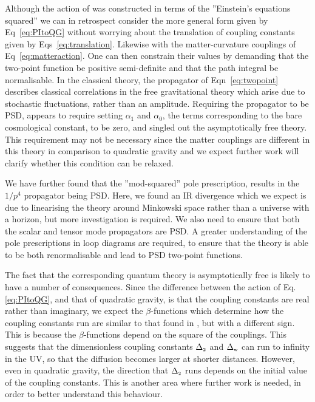 \documentclass[aps,preprintnumbers,superscriptaddress,longbibliography]{revtex4-1}
\def\R2Term{\Delta_{\text{\tiny 2}}}
\def\WeylTerm{\Delta_{\text{\tiny w}}}
\begin{document}
Although the action of \cite{oppenheim2023covariant} was constructed in terms of the ''Einstein's equations squared'' we can in retrospect consider the more general form given by Eq~\eqref{eq:PItoQG} without worrying about the translation of coupling constants given by Eqs~\eqref{eq:translation}. Likewise with the matter-curvature couplings of Eq~\eqref{eq:matteraction}. One can then constrain their values by demanding that the two-point function be positive semi-definite and that the path integral be normalisable.  In the classical theory, the propagator of  Eqn~\eqref{eq:twopoint} describes classical correlations in the free gravitational theory which arise due to stochastic fluctuations, rather than an amplitude. Requiring the propagator to be PSD, appears to require setting $\alpha_1$ and $\alpha_0$, the terms corresponding to the bare cosmological constant, to be zero, and singled out the asymptotically free theory. This requirement may not be necessary since the matter couplings are different in this theory in comparison to quadratic gravity %
and we expect further work will clarify whether this condition can be relaxed.

We have further found that the ''mod-squared'' pole prescription, results in the $1/p^4$ propagator being  PSD.  Here, we found an IR divergence which we expect is due to linearising the theory around Minkowski space rather than a universe with a horizon, but more investigation is required. We also  need to 
ensure that both the scalar and tensor mode propagators are PSD. 
A greater understanding of the pole prescriptions in loop diagrams are required, to ensure that the theory is able to be both renormalisable and lead to PSD two-point functions.

The fact that the corresponding quantum theory is asymptotically free is likely to have a number of consequences.
Since the difference between the action of Eq. \eqref{eq:PItoQG}, and that of quadratic gravity, is that the coupling constants are real rather than imaginary, we expect the $\beta$-functions which determine how the coupling constants run are similar to that found in \cite{julve19781978quantum,fradkin1981renormalizable,benedetti2009asymtotic,buccio2024physical}, but with a different sign. This is because the $\beta$-functions depend on the square of the couplings. This suggests that the dimensionless coupling constants $\R2Term$ and $\WeylTerm$ can run to infinity in the UV, so that the diffusion becomes larger at shorter distances. However, even in quadratic gravity, the direction that $\R2Term$ runs depends on the initial value of the coupling constants. This is another area where further work is needed, in order to better understand this behaviour.
\end{document}

